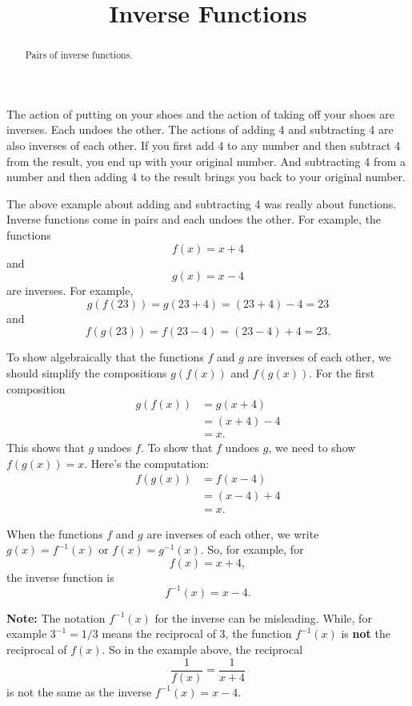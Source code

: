 \documentclass{ximera}
\title{Inverse Functions}
\begin{document}
\begin{abstract}
Pairs of inverse functions.
\end{abstract}
\maketitle

The action of putting on your shoes and the action of taking off your shoes are inverses. Each undoes the other. The actions of adding 4 and subtracting 4 are also inverses of each other. If you first add 4 to any number and then subtract 4 from the result, you end up with your original number. And subtracting 4 from a number and then adding 4 to the result brings you back to your original number. 


\begin{example} \label{Exd445t667}
The above example about adding and subtracting 4 was really about functions. Inverse functions come in pairs and each undoes the other. For example, the functions 
\[
    f(x) = x + 4
\]
and 
\[
  g(x) = x-4
\]
are inverses. For example,
\[
    g(f(23)) = g(23+4) =  (23+4) -4 = 23
\]
and
\[
    f(g(23)) = f(23-4) = (23-4) + 4 = 23 .
\]

To show algebraically that the functions $f$ and $g$ are inverses of each other, we should simplify the compositions $g(f(x))$ and $f(g(x))$. For the first composition
\begin{align*}
          g(f(x)) &= g(x+4)  \\
                    &= (x+4) - 4 \\
                    & = x .
\end{align*}
This shows that $g$ undoes $f$. To show that $f$ undoes $g$, we need to show $f(g(x))=x$. Here's the computation:
\begin{align*}
          f(g(x)) &= f(x-4)  \\
                    &= (x-4) + 4 \\
                    & = x .
\end{align*}


\end{example}



When the functions $f$ and $g$ are inverses of each other, we write $g(x) = f^{-1}(x)$ or $f(x) = g^{-1}(x)$. So, for example, for 
\[
   f(x) = x+4 ,
\]
the inverse function is
\[
   f^{-1}(x) = x-4.
\]

{\bf Note:} The notation $f^{-1}(x)$ for the inverse can be misleading. While, for example $3^{-1} = 1/3$ means the reciprocal of $3$, the function $f^{-1}(x)$ is {\bf not} the reciprocal of $f(x)$. So in the example above, the reciprocal
\[
     \frac{1}{f(x)} = \frac{1}{x+4} 
\] 
is not the same as the inverse $f^{-1}(x) = x-4$.
\end{document}
